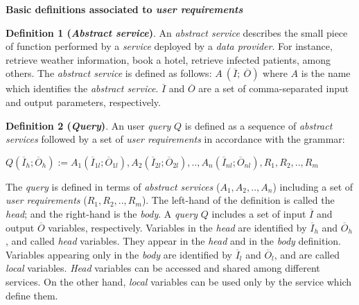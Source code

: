 \begin{flushleft}
\large \textbf{Basic definitions associated to \textsl{user requirements}}
\end{flushleft}


\noindent \textbf{Definition 1 (\textsl{Abstract service})}. An \textsl{abstract service} describes the small piece of function performed by a \textsl{service} deployed by a \textsl{data provider}. For instance, retrieve weather information, book a hotel, retrieve infected patients, among others. The \textsl{abstract service} is defined as follows: $A \ (\overline{I}; \ \overline{O})$ where $A$ is the name which identifies the \textsl{abstract service}. $\overline{I}$ and $\overline{O}$ are a set of comma-separated input and output parameters, respectively.

\bigskip
\noindent \textbf{Definition 2 (\textsl{Query})}.
An user \textsl{query} $Q$ is defined as a sequence of \textsl{abstract services} followed by a set of \textsl{user requirements} in accordance with the grammar:
%
\begin{center}
\begin{math}
Q (\overline{I}_{h}; \overline{O}_{h}) := A_{1}(\overline{I}_{1l};
\overline{O}_{1l}), A_{2}(\overline{I}_{2l}; \overline{O}_{2l}), ..,  A_{n}(\overline{I}_{nl}; \overline{O}_{nl}),R_{1},R_{2}, .., R_{m}
\end{math}
\end{center}
%
The \textsl{query} is defined in terms of \textsl{abstract services} ($A_{1}, A_{2}, .., A_{n}$) including a set of \textsl{user requirements} ($R_{1},R_{2}, .., R_{m}$). 
The left-hand of the definition is called the \textit{head}; and the right-hand is the \textit{body}. 
A \textsl{query} $Q$ includes a set of input $\overline{I}$ and output $\overline{O}$ variables, respectively.
Variables in the \textit{head} are identified by $\overline{I}_{h}$ and $\overline{O}_{h}$, and called \textit{head} variables. 
They appear in the \textit{head} and in the \textit{body} definition. 
Variables appearing only in the \textit{body} are identified by $\overline{I}_{l}$ and $\overline{O}_{l}$, and are called \textit{local} variables. \textit{Head} variables can be accessed and shared among different services. On the other hand, \textit{local} variables can be used only by the service which define them.
%


